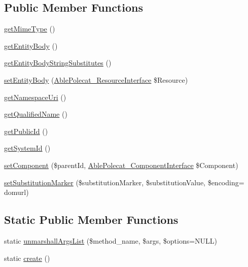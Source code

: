 \subsection*{Public Member Functions}
\begin{DoxyCompactItemize}
\item 
\hyperlink{class_able_polecat___message___response___xhtml_ac06e9f7b10fca30eb41e41d4dc108b1c}{get\+Mime\+Type} ()
\item 
\hyperlink{class_able_polecat___message___response___xhtml_a0841bf6c2f3e1f97f8c789475ee95b05}{get\+Entity\+Body} ()
\item 
\hyperlink{class_able_polecat___message___response___xhtml_a8d7090ef2290f14d12742016a5f2f775}{get\+Entity\+Body\+String\+Substitutes} ()
\item 
\hyperlink{class_able_polecat___message___response___xhtml_a858ab2a95af7d312509c203de5c6fb11}{set\+Entity\+Body} (\hyperlink{interface_able_polecat___resource_interface}{Able\+Polecat\+\_\+\+Resource\+Interface} \$Resource)
\item 
\hyperlink{class_able_polecat___message___response___xhtml_a88cf6b8ffab972f8db5d3312df206576}{get\+Namespace\+Uri} ()
\item 
\hyperlink{class_able_polecat___message___response___xhtml_ae39fb2f89f278e0702f6a55b616dd855}{get\+Qualified\+Name} ()
\item 
\hyperlink{class_able_polecat___message___response___xhtml_ac02f76ee2955927eb4e4e3324048cdc4}{get\+Public\+Id} ()
\item 
\hyperlink{class_able_polecat___message___response___xhtml_aface5fb500be28f11fe0014e401b806e}{get\+System\+Id} ()
\item 
\hyperlink{class_able_polecat___message___response___xhtml_a8fd1e9a81daba51c6293c121dcd8d1b8}{set\+Component} (\$parent\+Id, \hyperlink{interface_able_polecat___component_interface}{Able\+Polecat\+\_\+\+Component\+Interface} \$Component)
\item 
\hyperlink{class_able_polecat___message___response___xhtml_a45be0f75428ff58d02ed30eafb4f0f2e}{set\+Substitution\+Marker} (\$substitution\+Marker, \$substitution\+Value, \$encoding= \textquotesingle{}domurl\textquotesingle{})
\end{DoxyCompactItemize}
\subsection*{Static Public Member Functions}
\begin{DoxyCompactItemize}
\item 
static \hyperlink{class_able_polecat___message___response___xhtml_a94d2e558bba777f54dcc10f1bfc4dca5}{unmarshall\+Args\+List} (\$method\+\_\+name, \$args, \$options=N\+U\+L\+L)
\item 
static \hyperlink{class_able_polecat___message___response___xhtml_a239b1c70258014a86569483c2d009de6}{create} ()
\end{DoxyCompactItemize}
